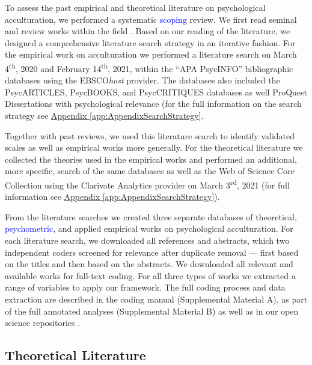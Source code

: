 \newcommand{\nTheo}{92}
\newcommand{\nMeth}{233}
\newcommand{\nEmp}{526}

To assess the past empirical and theoretical literature on psychological
acculturation, we performed a systematic \textcolor{blue}{scoping}
review. We first read seminal and review works within the field
\citep[including,][]{Ward2019, Berry1997b, Berry2003, Szapocznik1978, Sam2006a, Rudmin2003a}.
Based on our reading of the literature, we designed a comprehensive
literature search strategy in an iterative fashion. For the empirical
work on acculturation we performed a literature search on March
4\textsuperscript{th}, 2020 and February 14\textsuperscript{th}, 2021,
within the ``APA PsycINFO'' bibliographic databases using the
EBSCO\textit{host} provider. The databases also included the
PsycARTICLES, PsycBOOKS, and PsycCRITIQUES databases as well ProQuest
Dissertations with psychological relevance (for the full information on
the search strategy see
\hyperref[app:AppendixSearchStrategy]{Appendix \ref*{app:AppendixSearchStrategy}}.

Together with past reviews, we used this literature search to identify
validated scales as well as empirical works more generally. For the
theoretical literature we collected the theories used in the empirical
works and performed an additional, more specific, search of the same
databases as well as the Web of Science Core Collection using the
Clarivate Analytics provider on March 3\textsuperscript{rd}, 2021 (for
full information see
\hyperref[app:AppendixSearchStrategy]{Appendix \ref*{app:AppendixSearchStrategy}}).

From the literature searches we created three separate databases of
theoretical, \textcolor{blue}{psychometric}, and applied empirical works
on psychological acculturation. For each literature search, we
downloaded all references and abstracts, which two independent coders
screened for relevance after duplicate removal --- first based on the
titles and then based on the abstracts. We downloaded all relevant and
available works for full-text coding. For all three types of works we
extracted a range of variables to apply our framework. The full coding
process and data extraction are described in the coding manual
(Supplemental Material A), as part of the full annotated analyses
(Supplemental Material B) as well as in our open science repositories
\citep[see][]{Kreienkamp2021d, Kreienkamp2021e}.

\subsection{Theoretical Literature}

